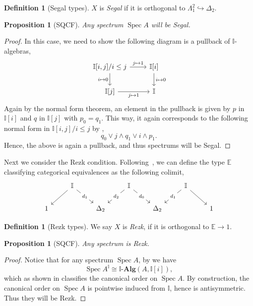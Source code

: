 \documentclass[12pt]{amsart}
\newtheorem{proposition}[theorem]{Proposition}
\theoremstyle{definition}
\newtheorem{definition}[theorem]{Definition}
\newcommand{\mb}[1]{\mathbf{#1}}
\newcommand{\mbb}[1]{\mathbb{#1}}
\newcommand{\I}{\mbb I}
\newcommand{\alg}{\text{-}\mb{Alg}}
\newcommand{\hook}{\hookrightarrow}
\newcommand{\spec}{\operatorname{Spec}}
\begin{document}
\begin{definition}[Segal types]
  $X$ is \emph{Segal} if it is orthogonal to $\Lambda^2_1 \hook \Delta_2$.
\end{definition}

\begin{proposition}[SQCF]
  Any spectrum $\spec A$ will be Segal.
\end{proposition}
\begin{proof}
  In this case, we need to show the following diagram is a pullback of $\I$-algebras, 
  \[
  \begin{tikzcd}
    \I[i,j]/i\le j \ar[r, "j \mapsto 1"] \ar[d, "i \mapsto 0"'] & \I[i] \ar[d, "i \mapsto 0"] \\
    \I[j] \ar[r, "j \mapsto 1"'] & \I
  \end{tikzcd}
  \]
  Again by the normal form theorem, an element in the pullback is given by $p$ in $\I[i]$ and $q$ in $\I[j]$ with $p_0 = q_1$. This way, it again corresponds to the following normal form in $\I[i,j]/i \le j$ by ,
  \[ q_0 \vee j \wedge q_1 \vee i \wedge p_1. \]
  Hence, the above is again a pullback, and thus spectrums will be Segal.
\end{proof}

Next we consider the Rezk condition. Following~\cite{buchholtz2021synthetic}, we can define the type $\mbb E$ classifying categorical equivalences as the following colimit,
\[
\begin{tikzcd}
	& \I && \I && \I \\
	1 && {\Delta_2} && {\Delta_2} && 1
	\arrow[from=1-2, to=2-1]
	\arrow["{d_1}"{description}, from=1-2, to=2-3]
	\arrow["{d_2}"{description}, from=1-4, to=2-3]
	\arrow["{d_0}"{description}, from=1-4, to=2-5]
	\arrow["{d_1}"{description}, from=1-6, to=2-5]
	\arrow[from=1-6, to=2-7]
\end{tikzcd}
\]

\begin{definition}[Rezk types]
  We say $X$ is \emph{Rezk}, if it is orthogonal to $\mbb E \to 1$.
\end{definition}

\begin{proposition}[SQCF]
  Any spectrum is Rezk.
\end{proposition}
\begin{proof}
  Notice that for any spectrum $\spec A$, by  we have
  \[ \spec A^\I \cong \I\alg(A,\I[i]), \]
  which as shown in  classifies the canonical order on $\spec A$. By construction, the canonical order on $\spec A$ is pointwise induced from $\I$, hence is antisymmetric. Thus they will be Rezk.
\end{proof}
\end{document}
